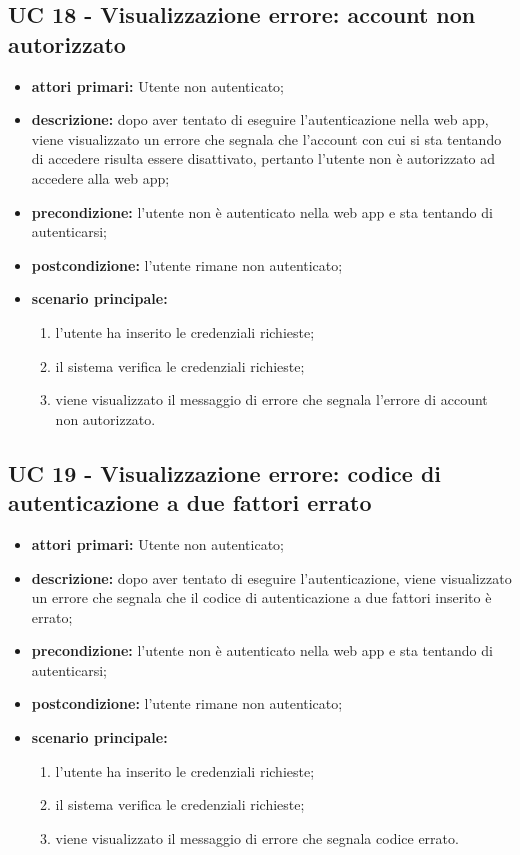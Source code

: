 
		\subsection{UC 18 - Visualizzazione errore: account non autorizzato}
		\begin{itemize}
			\item \textbf{attori primari:} Utente non autenticato;
			\item \textbf{descrizione:} dopo aver tentato di eseguire l'autenticazione nella web app, viene visualizzato un errore che segnala che l'account con cui si sta tentando di accedere risulta essere disattivato, pertanto l'utente non è autorizzato ad accedere alla web app;
			\item \textbf{precondizione:} l'utente non è autenticato nella web app e sta tentando di autenticarsi;
			\item \textbf{postcondizione:} l'utente rimane non autenticato;
			\item \textbf{scenario principale:}
			\begin{enumerate}
				\item l'utente ha inserito le credenziali richieste;
				\item il sistema verifica le credenziali richieste;
				\item viene visualizzato il messaggio di errore che segnala l'errore di account non autorizzato.
			\end{enumerate}
		\end{itemize}


		\subsection{UC 19 - Visualizzazione errore: codice di autenticazione a due fattori errato}
		\begin{itemize}
			\item \textbf{attori primari:} Utente non autenticato;
			\item \textbf{descrizione:} dopo aver tentato di eseguire l'autenticazione, viene visualizzato un errore che segnala che il codice di autenticazione a due fattori inserito è errato;
			\item \textbf{precondizione:} l'utente non è autenticato nella web app e sta tentando di autenticarsi;
			\item \textbf{postcondizione:} l'utente rimane non autenticato;
			\item \textbf{scenario principale:}
			\begin{enumerate}
				\item l'utente ha inserito le credenziali richieste;
				\item il sistema verifica le credenziali richieste;
				\item viene visualizzato il messaggio di errore che segnala codice errato.
			\end{enumerate}
		\end{itemize}


